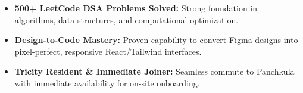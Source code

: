 \documentclass[a4paper,10pt]{article}
\begin{document}
\begin{itemize}

    \item \textbf{500+ LeetCode DSA Problems Solved:} Strong foundation in algorithms, data structures, and computational optimization.

    \item \textbf{Design-to-Code Mastery:} Proven capability to convert Figma designs into pixel-perfect, responsive React/Tailwind interfaces.

    \item \textbf{Tricity Resident \& Immediate Joiner:} Seamless commute to Panchkula with immediate availability for on-site onboarding.

\end{itemize}

\end{document}
